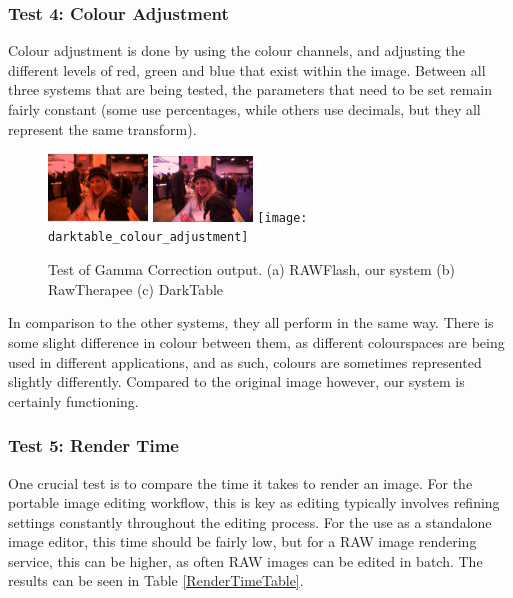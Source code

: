 \documentclass[10pt,a4paper]{article}
\begin{document}
\subsubsection{Test 4: Colour Adjustment}
Colour adjustment is done by using the colour channels, and adjusting the different levels of red, green and blue that exist within the image.
Between all three systems that are being tested, the parameters that need to be set remain fairly constant (some use percentages, while others use decimals,
but they all represent the same transform).

\begin{figure}\label{colouradjustmentcomparison}
    \centering
    \subfigure
    {
        \includegraphics[width=100px]{rawflash_colour_adjustment}
    }
    \subfigure
    {
        \includegraphics[width=100px]{rawtherapee_colour_adjustment}
    }
    \subfigure
    {
        \texttt{[image: darktable\_colour\_adjustment]}
    }
    \caption{
        Test of Gamma Correction output. 
        (a) RAWFlash, our system
        (b) RawTherapee
        (c) DarkTable
    }
 \end{figure}
In comparison to the other systems, they all perform in the same way. There is some slight difference in colour between them, as different colourspaces
are being used in different applications, and as such, colours are sometimes represented slightly differently. Compared to the original image however, our
system is certainly functioning.

\subsubsection{Test 5: Render Time}
One crucial test is to compare the time it takes to render an image. For the portable image editing workflow, this is key as editing typically involves
refining settings constantly throughout the editing process. For the use as a standalone image editor, this time should be fairly low, but for a RAW
image rendering service, this can be higher, as often RAW images can be edited in batch. The results can be seen in Table \ref{RenderTimeTable}.
\end{document}
